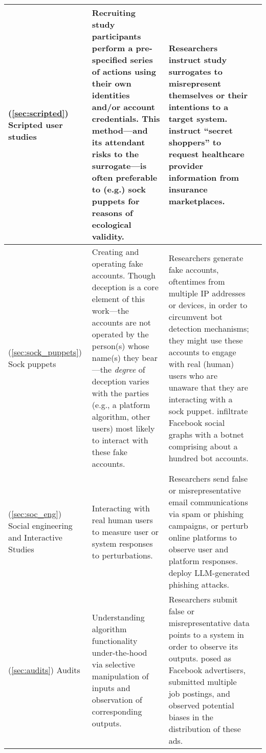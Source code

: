 \begin{table*}[ht]
\begin{tabular}{p{2cm}|p{6.0cm}p{6.0cm}p{2cm}}
        \hline
        (\ref{sec:scripted}) Scripted user studies & Recruiting study participants perform a pre-specified series of actions using their own identities and/or account credentials. This method---and its attendant risks to the surrogate---is often preferable to (e.g.) sock puppets for reasons of ecological validity. & Researchers instruct study surrogates to misrepresent themselves or their intentions to a target system. \cite{haeder2016secret} instruct ``secret shoppers'' to request healthcare provider information from insurance marketplaces. & \cite{haeder2016secret, dimkov2010two} \\
        \hline
        (\ref{sec:sock_puppets}) Sock puppets & Creating and operating fake accounts. Though deception is a core element of this work---the accounts are not operated by the person(s) whose name(s) they bear---the \textit{degree} of deception varies with the parties (e.g., a platform algorithm, other users) most likely to interact with these fake accounts. & Researchers generate fake accounts, oftentimes from multiple IP addresses or devices, in order to circumvent bot detection mechanisms; they might use these accounts to engage with real (human) users who are unaware that they are interacting with a sock puppet. \cite{boshmaf2011socialbot} infiltrate Facebook social graphs with a botnet comprising about a hundred bot accounts. & \cite{boshmaf2011socialbot, srba2023auditing, bandy2021more} \\
        \hline
        (\ref{sec:soc_eng}) Social engineering and Interactive Studies & Interacting with real human users to measure user or system responses to perturbations. & Researchers send false or misrepresentative email communications via spam or phishing campaigns, or perturb online platforms to observe user and platform responses. \cite{royChatbotsPhishbotsPhishing2024} deploy LLM-generated phishing attacks. & \cite{di2022revisiting, acharyaConningCryptoConman2024, jakobssonWhyHowPerform2008, royChatbotsPhishbotsPhishing2024} %
        \\
        \hline
        (\ref{sec:audits}) Audits & Understanding algorithm functionality under-the-hood via selective manipulation of inputs and observation of corresponding outputs.  & Researchers submit false or misrepresentative data points to a system in order to observe its outputs. \cite{kaplanMeasurementAnalysisImplied2022} posed as Facebook advertisers, submitted multiple job postings, and observed potential biases in the distribution of these ads. & \cite{kaplanMeasurementAnalysisImplied2022, westPictureWorth5002024, chengALIFLowCostAdversarial2024, jiangCanHearYour, kimScoresTellEverything2024} \\

\end{tabular}
\end{table*}
